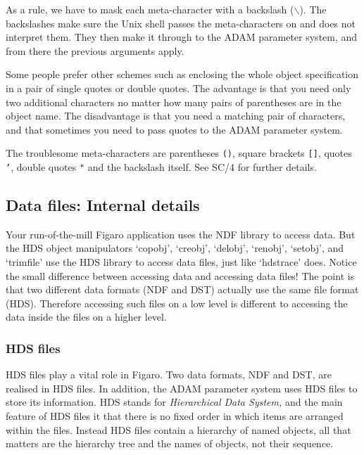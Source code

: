 \documentclass[11pt,twoside]{article}
\newcommand{\stardocinitials}  {SUN}
\newcommand{\stardocnumber}    { 86.21}
\newcommand{\stardocname}{\stardocinitials /\stardocnumber}
\newcommand{\xref}[3]{#1}
\newcommand{\xlabel}[1]{}
\begin{document}
   As a rule, we have to mask each meta-character with a backslash
   ($\backslash$). The backslashes make
   sure the Unix shell passes the meta-characters on and does not
   interpret them. They then make it through to the ADAM parameter
   system, and from there the previous arguments apply.

   Some people prefer other schemes such as enclosing the whole
   object specification in a pair of single quotes or double
   quotes. The advantage is that you need only two additional
   characters no matter how many pairs of parentheses are in the
   object name. The disadvantage is that you need a matching pair of
   characters, and that sometimes you need to pass quotes to the ADAM
   parameter system.

   The troublesome meta-characters are parentheses {\tt ()}, square
   brackets {\tt []}, quotes {\tt '}, double quotes {\tt "} and the
   backslash itself.  See \xref{SC/4}{sc4}{} for further details.


\subsection{\xlabel{files}\label{files}Data files: Internal details}
\markboth{Advanced users: Data files}{\stardocname}

   Your run-of-the-mill Figaro application uses the NDF library to
   access data. But the HDS object manipulators `copobj', `creobj',
   `delobj', `renobj', `setobj', and `trimfile' use the HDS library to
   access data files, just like `hdstrace' does. Notice the small
   difference between accessing data and accessing data files! The
   point is that two different data formats (NDF and DST) actually use
   the same file format (HDS). Therefore accessing such files on a low
   level is different to accessing the data inside the files on a
   higher level.


\subsubsection{\label{fileshds}HDS files}

   HDS files play a vital role in Figaro. Two data formats, NDF and
   DST, are realised in HDS files. In addition, the ADAM parameter
   system uses HDS files to store its information. HDS stands for
{\em Hierarchical Data System,\/}
   and the main feature of HDS files it that there is no fixed order in
   which items are arranged within the files. Instead HDS files contain
   a hierarchy of named objects, all that matters are the hierarchy tree
   and the names of objects, not their sequence.
\end{document}
